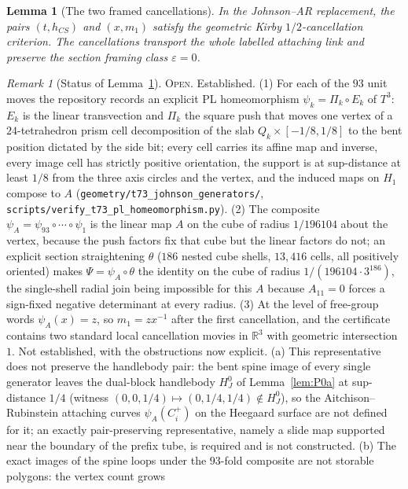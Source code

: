 \documentclass[11pt]{amsart}
\newtheorem{lemma}[theorem]{Lemma}
\theoremstyle{definition}
\theoremstyle{remark}
\newtheorem{remark}[theorem]{Remark}
\newcommand{\Open}{\textnormal{\textsc{Open}}}
\begin{document}
\begin{lemma}[The two framed cancellations]\label{lem:P0b}
In the Johnson--AR replacement, the pairs \((t,h_{CS})\) and \((x,m_1)\)
satisfy the geometric Kirby \(1/2\)-cancellation criterion.  The
cancellations transport the whole labelled attaching link and preserve the
section framing class \(\varepsilon=0\).
\end{lemma}

\begin{remark}[Status of Lemma~\ref{lem:P0b}]
\Open.  Established.  (1) For each of the $93$ unit moves the repository
records an explicit PL homeomorphism $\psi_k=\Pi_k\circ E_k$ of $T^3$:
$E_k$ is the linear transvection and $\Pi_k$ the square push that moves one
vertex of a $24$-tetrahedron prism cell decomposition of the slab
$Q_k\times[-1/8,1/8]$ to the bent position dictated by the side bit; every
cell carries its affine map and inverse, every image cell has strictly
positive orientation, the support is at sup-distance at least $1/8$ from
the three axis circles and the vertex, and the induced maps on $H_1$
compose to $A$ (\texttt{geometry/t73\_johnson\_generators/},
\texttt{scripts/verify\_t73\_pl\_homeomorphism.py}).  (2) The composite
$\psi_A=\psi_{93}\circ\cdots\circ\psi_1$ is the linear map $A$ on the cube
of radius $1/196104$ about the vertex, because the push factors fix that
cube but the linear factors do not; an explicit section straightening
$\theta$ ($186$ nested cube shells, $13{,}416$ cells, all positively
oriented) makes $\Psi=\psi_A\circ\theta$ the identity on the cube of
radius $1/(196104\cdot3^{186})$, the single-shell radial join being
impossible for this $A$ because $A_{11}=0$ forces a sign-fixed negative
determinant at every radius.  (3) At the level of free-group words
$\psi_A(x)=z$, so $m_1=zx^{-1}$ after the first cancellation, and the
certificate contains two standard local cancellation movies in
$\mathbb R^3$ with geometric intersection $1$.
Not established, with the obstructions now explicit.  (a) This
representative does not preserve the handlebody pair: the bent spine
image of every single generator leaves the dual-block handlebody $H_J^0$
of Lemma~\ref{lem:P0a} at sup-distance $1/4$ (witness
$(0,0,1/4)\mapsto(0,1/4,1/4)\notin H_J^0$), so the Aitchison--Rubinstein
attaching curves $\psi_A(C_i^+)$ on the Heegaard surface are not defined
for it; an exactly pair-preserving representative, namely a slide map
supported near the boundary of the prefix tube, is required and is not
constructed.  (b) The exact images of the spine loops under the
$93$-fold composite are not storable polygons: the vertex count grows

\end{remark}
\end{document}
